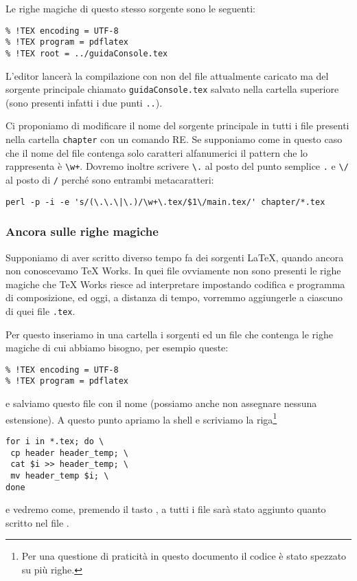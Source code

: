 Le righe magiche di questo stesso sorgente sono le seguenti:
\begin{verbatim}
% !TEX encoding = UTF-8
% !TEX program = pdflatex
% !TEX root = ../guidaConsole.tex
\end{verbatim}
L'editor lancerà la compilazione con  non del file attualmente caricato ma del sorgente principale chiamato \texttt{guidaConsole.tex} salvato nella cartella superiore (sono presenti infatti i due punti \texttt{..}).

Ci proponiamo di modificare il nome del sorgente principale in tutti i file presenti nella cartella \texttt{chapter} con un comando RE. Se supponiamo come in questo caso che il nome del file contenga solo caratteri alfanumerici il pattern che lo rappresenta è \texttt{\textbackslash w+}. Dovremo inoltre scrivere \texttt{\textbackslash .} al posto del punto semplice \texttt{.} e \texttt{\textbackslash /} al posto di \texttt{/} perché sono entrambi metacaratteri: 
\begin{Verbatim}[fontsize=\small]
perl -p -i -e 's/(\.\.\|\.)/\w+\.tex/$1\/main.tex/' chapter/*.tex
\end{Verbatim}

\subsubsection{Ancora sulle righe magiche}
\label{sssec:addheader}

Supponiamo di aver scritto diverso tempo fa dei sorgenti \LaTeX, quando ancora non conoscevamo TeX Works. In quei file ovviamente non sono
presenti le righe magiche che TeX Works riesce ad
interpretare impostando codifica e programma di composizione, ed oggi, a distanza di tempo, vorremmo aggiungerle a ciascuno di quei file \texttt{.tex}.

Per questo inseriamo in una cartella i sorgenti ed un file che contenga le righe magiche di cui abbiamo bisogno, per esempio queste:
\begin{Verbatim}
% !TEX encoding = UTF-8
% !TEX program = pdflatex
\end{Verbatim}
e salviamo questo file con il nome  (possiamo anche non assegnare nessuna estensione). A questo punto apriamo la shell e scriviamo la riga\footnote{Per una questione di praticità in questo documento il codice è stato spezzato su più righe.}
\begin{Verbatim}
for i in *.tex; do \
 cp header header_temp; \
 cat $i >> header_temp; \
 mv header_temp $i; \
done
\end{Verbatim}
e vedremo come, premendo il tasto \keys{\return}, a tutti i file sarà stato aggiunto quanto scritto nel file . 

